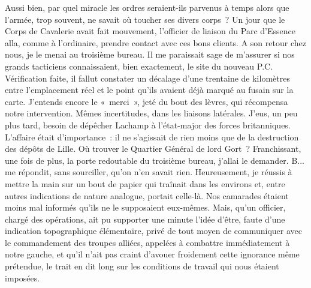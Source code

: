 \documentclass[french,twoside]{book} %
\begin{document}
Aussi bien, par quel miracle les ordres seraient-ils   parvenus à temps alors que l’armée, trop souvent, ne savait où toucher ses divers corps ? Un jour que le Corps de Cavalerie avait fait mouvement, l’officier de liaison du Parc d’Essence alla, comme à l’ordinaire, prendre contact avec ces bons clients. A son retour chez nous, je le menai au troisième bureau. Il me paraissait sage de m’assurer si nos grands tacticiens connaissaient, bien exactement, le site du nouveau P.C. Vérification faite, il fallut constater un décalage d’une trentaine de kilomètres entre l’emplacement réel et le point qu’ils avaient déjà marqué au fusain sur la carte. J’entends encore le « merci », jeté du bout des lèvres, qui récompensa notre intervention. Mêmes incertitudes, dans les liaisons latérales. J’eus, un peu plus tard, besoin de dépêcher Lachamp à l’état-major des forces britanniques. L’affaire était d’importance : il ne s’agissait de rien moins que de la destruction des dépôts de Lille. Où trouver le Quartier Général de lord Gort ? Franchissant, une fois de plus, la porte redoutable du troisième bureau, j’allai le demander. B... me répondit, sans sourciller, qu’on n’en savait rien. Heureusement, je réussis à mettre la main sur un bout de papier qui traînait dans les environs et, entre autres indications de nature analogue, portait celle-là. Nos camarades étaient moins mal informés qu’ils ne le supposaient eux-mêmes. Mais, qu’un officier, chargé des opérations, ait pu supporter une minute l’idée d’être, faute d’une indication topographique élémentaire, privé de tout moyen de communiquer avec le commandement des troupes alliées, appelées à combattre immédiatement à notre gauche, et qu’il n’ait pas craint d’avouer froidement cette ignorance même prétendue, le trait en dit long sur les conditions de travail qui nous étaient imposées.\par
\end{document}
